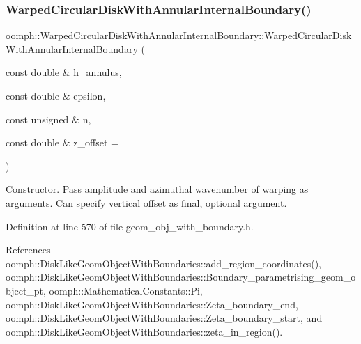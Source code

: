\subsubsection{\texorpdfstring{Warped\+Circular\+Disk\+With\+Annular\+Internal\+Boundary()}{WarpedCircularDiskWithAnnularInternalBoundary()}\hspace{0.1cm}{\footnotesize\ttfamily [1/2]}}
{\footnotesize\ttfamily oomph\+::\+Warped\+Circular\+Disk\+With\+Annular\+Internal\+Boundary\+::\+Warped\+Circular\+Disk\+With\+Annular\+Internal\+Boundary (\begin{DoxyParamCaption}\item[{const double \&}]{h\+\_\+annulus,  }\item[{const double \&}]{epsilon,  }\item[{const unsigned \&}]{n,  }\item[{const double \&}]{z\+\_\+offset = {} }\end{DoxyParamCaption})\hspace{0.3cm}{\ttfamily [inline]}}

Constructor. Pass amplitude and azimuthal wavenumber of warping as arguments. Can specify vertical offset as final, optional argument. 

Definition at line 570 of file geom\+\_\+obj\+\_\+with\+\_\+boundary.\+h.



References oomph\+::\+Disk\+Like\+Geom\+Object\+With\+Boundaries\+::add\+\_\+region\+\_\+coordinates(), oomph\+::\+Disk\+Like\+Geom\+Object\+With\+Boundaries\+::\+Boundary\+\_\+parametrising\+\_\+geom\+\_\+object\+\_\+pt, oomph\+::\+Mathematical\+Constants\+::\+Pi, oomph\+::\+Disk\+Like\+Geom\+Object\+With\+Boundaries\+::\+Zeta\+\_\+boundary\+\_\+end, oomph\+::\+Disk\+Like\+Geom\+Object\+With\+Boundaries\+::\+Zeta\+\_\+boundary\+\_\+start, and oomph\+::\+Disk\+Like\+Geom\+Object\+With\+Boundaries\+::zeta\+\_\+in\+\_\+region().

\mbox{\label{classoomph_1_1WarpedCircularDiskWithAnnularInternalBoundary_ad41f0d8afd8bbaf9a3b5a7d8d3a852b7}} 
